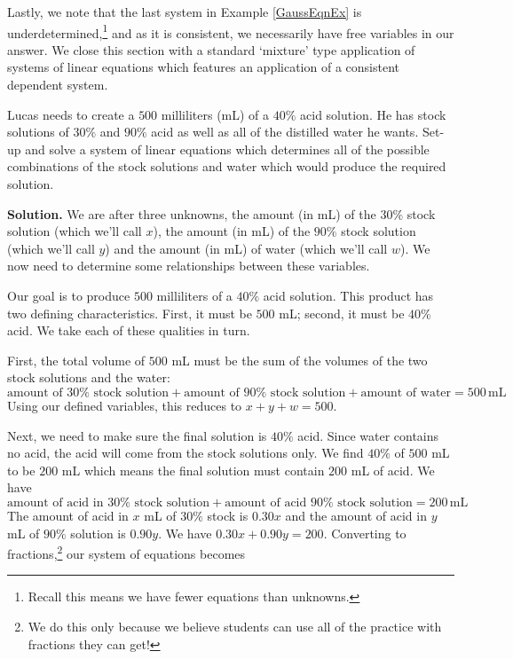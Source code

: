 \documentclass{ximera}
\begin{document}
Lastly, we note that the last system in Example \ref{GaussEqnEx} is underdetermined,\footnote{Recall this means we have fewer equations than unknowns.}  and as it is consistent, we necessarily have free variables in our answer.  We close this section with a standard `mixture' type application of systems of linear equations which features an application of a consistent dependent system.

\begin{example} \label{lucasmixex} Lucas needs to create a $500$ milliliters (mL) of a $40 \%$ acid solution.  He has stock solutions of $30 \%$ and $90 \%$ acid as well as all of the distilled water he wants. Set-up and solve a system of linear equations which determines all of the possible combinations of the stock solutions and water which would produce the required solution.

 

{ \bf Solution.}  We are after three unknowns, the amount (in mL) of the $30 \%$ stock solution (which we'll call $x$), the amount (in mL) of the $90 \%$ stock solution (which we'll call $y$) and the amount (in mL) of water (which we'll call $w$). We now need to determine some relationships between these variables.  

Our goal is to produce $500$ milliliters of a $40 \%$ acid solution.  This product has two defining characteristics.  First, it must be $500$ mL;  second, it must be $40 \%$ acid.  We take each of these qualities in turn.  

First, the total volume of $500$ mL must be the sum of the volumes of the two stock solutions and the water: \[ \mbox{amount of  $30 \%$ stock solution} + \mbox{amount of  $90 \%$ stock solution} + \mbox{amount of water} = 500 \, \mbox{mL}\] Using our defined variables, this reduces to $x+y+w = 500$.  

Next, we need to make sure the final solution is $40 \%$ acid.   Since water contains no acid, the acid will come from the stock solutions only.  We find $40 \%$ of $500$ mL to be $200$ mL which means the final solution must contain $200$ mL of acid.  We have \[ \mbox{amount of  acid in $30 \%$ stock solution} + \mbox{amount of acid $90 \%$ stock solution}  = 200 \, \mbox{mL}\]  The amount of acid in  $x$ mL of $30 \%$ stock is $0.30x$ and the amount of acid in $y$ mL of $90 \%$ solution is $0.90y$.  We have $0.30x + 0.90y = 200$.  Converting to fractions,\footnote{We do this only because we believe students can use all of the practice with fractions they can get!} our system of equations becomes 


\end{example}
\end{document}
